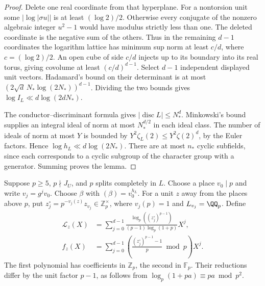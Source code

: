 \documentclass[a4paper,11pt]{article}
\theoremstyle{definition}
\theoremstyle{remark}
\newcommand{\ZZ}{\mathbb Z}\newcommand{\ord}{\operatorname{ord}}
\numberwithin{equation}{section}
\begin{document}
\begin{proof}
Delete one real coordinate from that hyperplane. For a nontorsion
unit some \(|\log|\sigma u||\) is at least \((\log 2)/2\). Otherwise
every conjugate of the nonzero algebraic integer \(u^2-1\) would
have modulus strictly less than one. The deleted coordinate is the
negative sum of the others. Thus in the remaining \(d-1\) coordinates
the logarithm lattice has minimum sup norm at least
\(c/d\), where \(c=(\log2)/2\). An open cube of side \(c/d\)
injects up to its boundary into its real torus, giving covolume at
least \((c/d)^{d-1}\). Select \(d-1\) independent displayed unit
vectors. Hadamard's bound on their determinant is at most
\((2\sqrt d\,N_*\log(2N_*))^{d-1}\). Dividing the two bounds gives
\(\log I_L\ll d\log(2dN_*)\).

The conductor--discriminant formula gives \(|\operatorname{disc} L|
\le N_*^d\). Minkowski's bound supplies an integral ideal of norm at
most \(N_*^{d/2}\) in each ideal class. The number of ideals of norm
at most \(Y\) is bounded by \(Y^2\zeta_L(2)\le Y^2\zeta(2)^d\), by
the Euler factors. Hence \(\log h_L\ll d\log(2N_*)\). There are at
most \(n_*\) cyclic subfields, since each corresponds to a cyclic
subgroup of the character group with a generator. Summing proves
the lemma.
\end{proof}

Suppose \(p\ge5\), \(p\nmid J_U\), and \(p\) splits completely in
\(L\). Choose a place \(v_0\mid p\) and write \(v_j=g^jv_0\). Choose
\(\beta\) with \((\beta)=v_0^{h_L}\). For a unit \(z\) away from the
places above \(p\), put \(z_j^\circ=p^{-v_j(z)}z_{v_j}\in\ZZ_p^\times\),
where \(v_j(p)=1\) and \(L_{v_j}=\QQ_p\). Define
\[
 \begin{split}
 \mathcal L_z(X)&=\sum_{j=0}^{d-1}
    \frac{\log_p((z_j^\circ)^{p-1})}{(p-1)\log_p(1+p)}X^j,
       \\[-2pt]
 f_z(X)&=\sum_{j=0}^{d-1}
       \left(\frac{(z_j^\circ)^{p-1}-1}{p}\bmod p\right)X^j .
 \end{split}
\]
The first polynomial has coefficients in \(\ZZ_p\), the second in
\(\mathbb F_p\). Their reductions differ by the unit factor \(p-1\),
as follows from \(\log_p(1+pa)\equiv pa\bmod p^2\).
\end{document}
